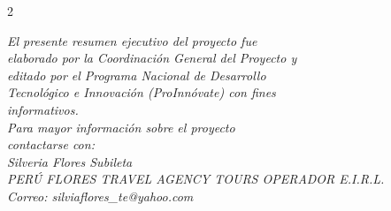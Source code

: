 \documentclass[12pt]{article}
\begin{document}
\begin{multicols}{2}
\vspace{0.25cm}
\begin{center}
\scriptsize\itshape
El presente resumen ejecutivo del proyecto fue\\
elaborado por la Coordinación General del Proyecto y\\
editado por el Programa Nacional de Desarrollo\\
Tecnológico e Innovación (ProInnóvate) con fines\\
informativos.\\[0.2cm]
Para mayor información sobre el proyecto\\
contactarse con:\\
Silveria Flores Subileta\\
PERÚ FLORES TRAVEL AGENCY TOURS OPERADOR E.I.R.L.\\
Correo: silviaflores\_te@yahoo.com
\end{center}
\end{multicols}
\end{document}
